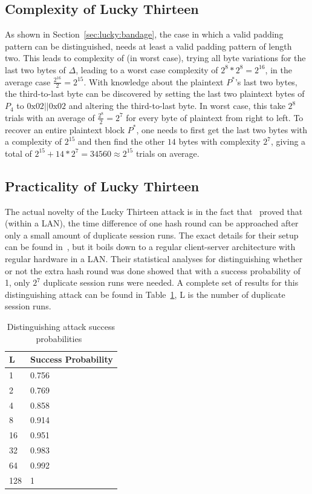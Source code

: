 \documentclass[10pt,conference,a4paper]{IEEEtran}
\begin{document}
\subsection{Complexity of Lucky Thirteen}
\label{sec:lucky:complexity}
As shown in Section~\ref{sec:lucky:bandage}, the case in which a valid padding pattern can be distinguished, needs at least a valid padding pattern of length two. This leads to complexity of (in worst case), trying all byte variations for the last two bytes of $\Delta$, leading to a worst case complexity of $2^8*2^8 = 2^{16}$, in the average case $\frac{2^{16}}{2} = 2^{15}$. With knowledge about the plaintext $P^{*}$'s last two bytes, the third-to-last byte can be discovered by setting the last two plaintext bytes of $P_4$ to $0\text{x}02||0\text{x}02$ and altering the third-to-last byte. In worst case, this take $2^8$ trials with an average of $\frac{2^8}{2} = 2^7$ for every byte of plaintext from right to left. To recover an entire plaintext block $P^{*}$, one needs to first get the last two bytes with a complexity of $2^{15}$ and then find the other $14$ bytes with complexity $2^7$, giving a total of $2^{15} + 14 * 2^7 = 34560 \approx 2^{15}$ trials on average.

\subsection{Practicality of Lucky Thirteen}
\label{sec:lucky:practicality}
The actual novelty of the Lucky Thirteen attack is in the fact that~\citeauthor{alfardan2013lucky} proved that (within a LAN), the time difference of one hash round can be approached after only a small amount of duplicate session runs. The exact details for their setup can be found in~\cite{alfardan2013lucky}, but it boils down to a regular client-server architecture with regular hardware in a LAN. Their statistical analyses for distinguishing whether or not the extra hash round was done showed that with a success probability of 1, only $2^7$ duplicate session runs were needed. A complete set of results for this distinguishing attack can be found in Table~\ref{sec:lucky:practicality:distinguishtable}, L is the number of duplicate session runs.

\begin{table}[h]
    \begin{tabular}{|l|l|}
    \hline
    L & Success Probability \\ \hline \hline
    1 & 0.756  \\ \hline
    2 & 0.769  \\ \hline
    4 & 0.858  \\ \hline
    8 & 0.914  \\ \hline
    16 & 0.951  \\ \hline
    32 & 0.983  \\ \hline
    64 & 0.992  \\ \hline
    128 & 1 \\ \hline
    \end{tabular}
    \caption{Distinguishing attack success probabilities~\cite{alfardan2013lucky}}
    \label{sec:lucky:practicality:distinguishtable}
\end{table}
\end{document}
